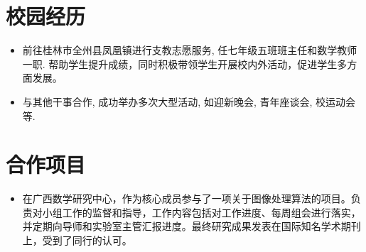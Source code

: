 \documentclass{resume}
\begin{document}
\section{校园经历}

\begin{itemize}
  \item 前往桂林市全州县凤凰镇进行支教志愿服务, 任七年级五班班主任和数学教师一职. 帮助学生提升成绩，同时积极带领学生开展校内外活动，促进学生多方面发展。
\end{itemize}

\begin{itemize}
  \item 与其他干事合作, 成功举办多次大型活动, 如迎新晚会, 青年座谈会, 校运动会等.
\end{itemize}


\section{合作项目}

\begin{itemize}[parsep=0.5ex]
  \item 在广西数学研究中心，作为核心成员参与了一项关于图像处理算法的项目。负责对小组工作的监督和指导，工作内容包括对工作进度、每周组会进行落实，并定期向导师和实验室主管汇报进度。最终研究成果发表在国际知名学术期刊上，受到了同行的认可。
\end{itemize}
\end{document}
